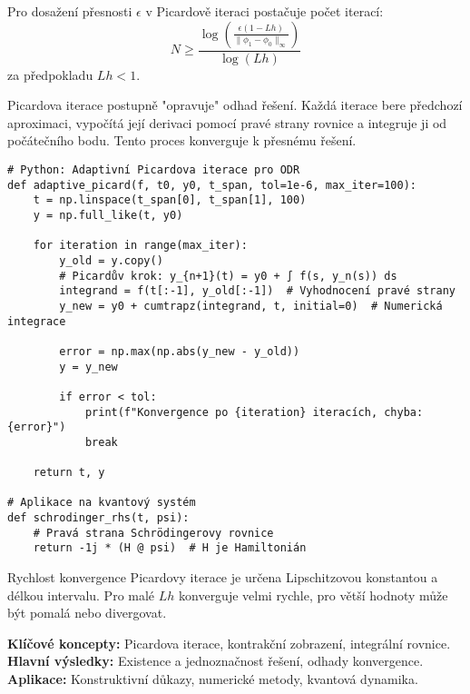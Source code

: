 \begin{theorem}
Pro dosažení přesnosti $\epsilon$ v Picardově iteraci postačuje počet iterací:
\[
N \geq \frac{\log\left(\frac{\epsilon(1-Lh)}{\|\phi_1-\phi_0\|_\infty}\right)}{\log(Lh)}
\]
za předpokladu $Lh < 1$.
\end{theorem}

\begin{intuition}
Picardova iterace postupně "opravuje" odhad řešení. Každá iterace bere předchozí aproximaci, vypočítá její derivaci pomocí pravé strany rovnice a integruje ji od počátečního bodu. Tento proces konverguje k přesnému řešení.
\end{intuition}

\begin{application}
\begin{verbatim}
# Python: Adaptivní Picardova iterace pro ODR
def adaptive_picard(f, t0, y0, t_span, tol=1e-6, max_iter=100):
    t = np.linspace(t_span[0], t_span[1], 100)
    y = np.full_like(t, y0)
    
    for iteration in range(max_iter):
        y_old = y.copy()
        # Picardův krok: y_{n+1}(t) = y0 + ∫ f(s, y_n(s)) ds
        integrand = f(t[:-1], y_old[:-1])  # Vyhodnocení pravé strany
        y_new = y0 + cumtrapz(integrand, t, initial=0)  # Numerická integrace
        
        error = np.max(np.abs(y_new - y_old))
        y = y_new
        
        if error < tol:
            print(f"Konvergence po {iteration} iteracích, chyba: {error}")
            break
    
    return t, y

# Aplikace na kvantový systém
def schrodinger_rhs(t, psi):
    # Pravá strana Schrödingerovy rovnice
    return -1j * (H @ psi)  # H je Hamiltonián
\end{verbatim}
\end{application}

\begin{keyinsight}
Rychlost konvergence Picardovy iterace je určena Lipschitzovou konstantou a délkou intervalu. Pro malé $Lh$ konverguje velmi rychle, pro větší hodnoty může být pomalá nebo divergovat.
\end{keyinsight}

\begin{summary}
\textbf{Klíčové koncepty:} Picardova iterace, kontrakční zobrazení, integrální rovnice. \\
\textbf{Hlavní výsledky:} Existence a jednoznačnost řešení, odhady konvergence. \\
\textbf{Aplikace:} Konstruktivní důkazy, numerické metody, kvantová dynamika.
\end{summary}

